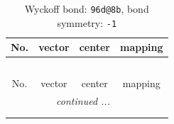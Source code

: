 \documentclass[fleqn,8pt]{jsarticle}
\begin{document}
\renewcommand{\arraystretch}{1.2}
\begin{longtable}{cccc}
\caption{Wyckoff bond: {\tt 96d@8b}, bond symmetry: {\tt -1}}
 \\
 \hline \hline
No. & vector & center & mapping \\ \hline \endfirsthead

\multicolumn{3}{l}{\tablename\ \thetable{}} \\
 \hline \hline
No. & vector & center & mapping \\ \hline \endhead

 \hline \hline
\multicolumn{3}{r}{\footnotesize\it continued ...} \\ \endfoot

 \hline \hline
\multicolumn{3}{r}{} \\ \endlastfoot


\end{longtable}
\end{document}
